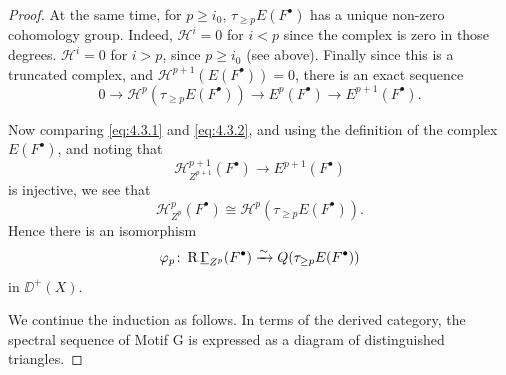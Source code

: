 \begin{proof}
At the same time, for $p\geq i_0$, $\tau_{\geq p}E(F^\bullet)$ has a unique non-zero cohomology group. Indeed, $\mathcal{H}^{i}=0$ for $i<p$ since the complex is zero in those degrees. $\mathcal{H}^{i}=0$ for $i>p$, since $p\geq i_0$ (see above). Finally since this is a truncated complex, and $\mathcal{H}^{p+1}(E(F^\bullet))=0$, there is an exact sequence
\begin{equation}\tag{2}\label{eq:4.3.2}
0\longrightarrow \mathcal{H}^{p}(\tau_{\geq p}E(F^\bullet))\longrightarrow E^{p}(F^\bullet)\longrightarrow E^{p+1}(F^\bullet).
\end{equation}

Now comparing \eqref{eq:4.3.1} and \eqref{eq:4.3.2}, and using the definition of the complex $E(F^\bullet)$, and noting that
\[
\mathcal{H}_{Z^{p+1}}^{p+1}(F^\bullet)\longrightarrow E^{p+1}(F^\bullet)
\]
is injective, we see that
\[
\mathcal{H}_{Z^{p}}^{p}(F^\bullet)\cong \mathcal{H}^{p}(\tau_{\geq p}E(F^\bullet)).
\]
Hence there is an isomorphism 
\[
\varphi_p\colon \operatorname{R}\underline{\Gamma}_{Z^p}(F^\bullet)\xrightarrow{\sim} Q(\tau_{\geq p}E(F^\bullet))
\]
in $\DD^+(X)$.

We continue the induction as follows. In terms of the derived category, the spectral sequence of Motif G is expressed as a diagram of distinguished triangles.


\end{proof}
